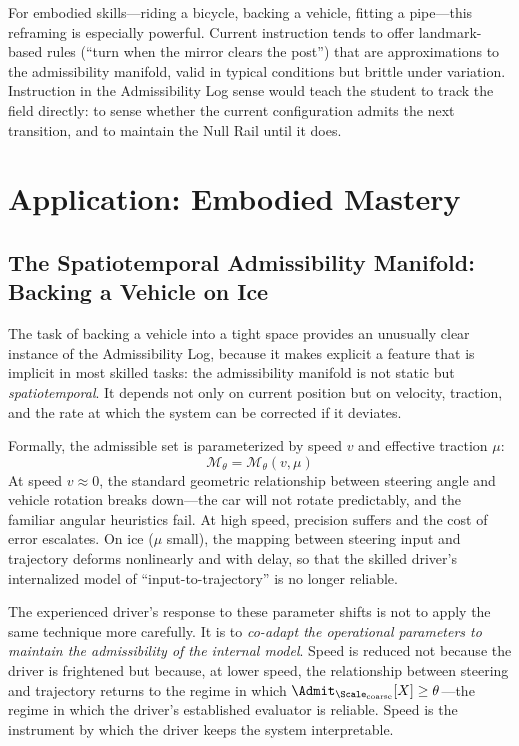 \documentclass[11pt,oneside]{book}
\begin{document}
For embodied skills---riding a bicycle, backing a vehicle, fitting a pipe---this reframing is especially powerful. Current instruction tends to offer landmark-based rules (``turn when the mirror clears the post'') that are approximations to the admissibility manifold, valid in typical conditions but brittle under variation. Instruction in the Admissibility Log sense would teach the student to track the field directly: to sense whether the current configuration admits the next transition, and to maintain the Null Rail until it does.

\chapter{Application: Embodied Mastery}

\section{The Spatiotemporal Admissibility Manifold: Backing a Vehicle on Ice}

The task of backing a vehicle into a tight space provides an unusually clear instance of the Admissibility Log, because it makes explicit a feature that is implicit in most skilled tasks: the admissibility manifold is not static but \textit{spatiotemporal}. It depends not only on current position but on velocity, traction, and the rate at which the system can be corrected if it deviates.

Formally, the admissible set is parameterized by speed $v$ and effective traction $\mu$:
\begin{equation}
    \mathcal{M}_\theta = \mathcal{M}_\theta(v, \mu)
\end{equation}
At speed $v \approx 0$, the standard geometric relationship between steering angle and vehicle rotation breaks down---the car will not rotate predictably, and the familiar angular heuristics fail. At high speed, precision suffers and the cost of error escalates. On ice ($\mu$ small), the mapping between steering input and trajectory deforms nonlinearly and with delay, so that the skilled driver's internalized model of ``input-to-trajectory'' is no longer reliable.

The experienced driver's response to these parameter shifts is not to apply the same technique more carefully. It is to \textit{co-adapt the operational parameters to maintain the admissibility of the internal model}. Speed is reduced not because the driver is frightened but because, at lower speed, the relationship between steering and trajectory returns to the regime in which $\Admit_{\Scale_{\mathrm{coarse}}}[X] \ge \theta$---the regime in which the driver's established evaluator is reliable. Speed is the instrument by which the driver keeps the system interpretable.
\end{document}
